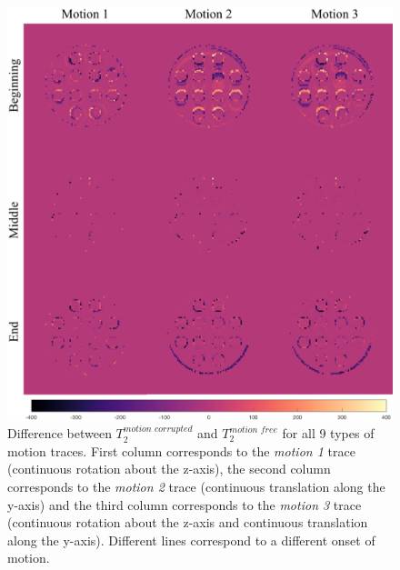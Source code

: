\begin{figure}[ht]
    \centering
    \includegraphics[width=1\textwidth]{images/mrf/T2SimuMinusT2Real}
    \caption{Difference between $T_2^{motion \, \, corrupted}$ and $T_2^{motion \, \, free}$ for all 9 types of motion traces. First column corresponds to the \textit{motion 1} trace (continuous rotation about the z-axis), the second column corresponds to the \textit{motion 2} trace (continuous translation along the y-axis) and the third column corresponds to the \textit{motion 3} trace (continuous rotation about the z-axis and continuous translation along the y-axis). Different lines correspond to a different onset of motion.}
    \label{fig:T2SimuMinusT2Real}
\end{figure}

